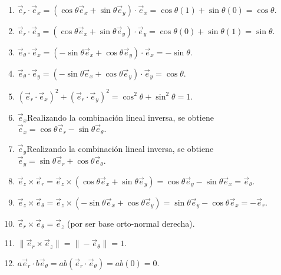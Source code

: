 \begin{sol}
    
\begin{enumerate}
    \item $\vec{e}_r \cdot \vec{e}_x = (\cos\theta\vec{e}_x + \sin\theta\vec{e}_y) \cdot \vec{e}_x = \cos\theta(1) + \sin\theta(0) = \cos\theta$.
    \item $\vec{e}_r \cdot \vec{e}_y = (\cos\theta\vec{e}_x + \sin\theta\vec{e}_y) \cdot \vec{e}_y = \cos\theta(0) + \sin\theta(1) = \sin\theta$.
    \item $\vec{e}_\theta \cdot \vec{e}_x = (-\sin\theta\vec{e}_x + \cos\theta\vec{e}_y) \cdot \vec{e}_x = -\sin\theta$.
    \item $\vec{e}_\theta \cdot \vec{e}_y = (-\sin\theta\vec{e}_x + \cos\theta\vec{e}_y) \cdot \vec{e}_y = \cos\theta$.
    \item $(\vec{e}_r \cdot \vec{e}_x)^2 + (\vec{e}_r \cdot \vec{e}_y)^2 = \cos^2\theta + \sin^2\theta = 1$.
    \item $\vec{e}_x$Realizando la combinación lineal inversa, se obtiene $\vec{e}_x = \cos\theta\vec{e}_r - \sin\theta\vec{e}_\theta$.
    \item $\vec{e}_y$Realizando la combinación lineal inversa, se obtiene $\vec{e}_y = \sin\theta\vec{e}_r + \cos\theta\vec{e}_\theta$.
    \item $\vec{e}_z \times \vec{e}_r = \vec{e}_z \times (\cos\theta\vec{e}_x + \sin\theta\vec{e}_y) = \cos\theta\vec{e}_y - \sin\theta\vec{e}_x = \vec{e}_\theta$.
    \item $\vec{e}_z \times \vec{e}_\theta = \vec{e}_z \times (-\sin\theta\vec{e}_x + \cos\theta\vec{e}_y) = \sin\theta\vec{e}_y - \cos\theta\vec{e}_x = -\vec{e}_r$.
    \item $\vec{e}_r \times \vec{e}_\theta = \vec{e}_z$ (por ser base orto-normal derecha).
    \item $\| \vec{e}_r \times \vec{e}_z \| = \| -\vec{e}_\theta \| = 1$.
    \item $a\vec{e}_r \cdot b\vec{e}_\theta = ab(\vec{e}_r \cdot \vec{e}_\theta) = ab(0) = 0$.
\end{enumerate}
\end{sol}
